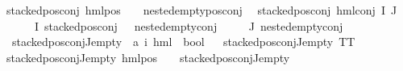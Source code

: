 \begin{isabellebody}
{\isachardoublequoteopen}stacked{\isacharunderscore}{\kern0pt}pos{\isacharunderscore}{\kern0pt}conj\ {\isacharparenleft}{\kern0pt}hml{\isacharunderscore}{\kern0pt}pos\ {\isacharunderscore}{\kern0pt}\ {\isasympsi}{\isacharparenright}{\kern0pt}{\isachardoublequoteclose}\ \ {\isachardoublequoteopen}nested{\isacharunderscore}{\kern0pt}empty{\isacharunderscore}{\kern0pt}pos{\isacharunderscore}{\kern0pt}conj\ {\isasympsi}{\isachardoublequoteclose}\ {\isacharbar}{\kern0pt}\isanewline
{\isachardoublequoteopen}stacked{\isacharunderscore}{\kern0pt}pos{\isacharunderscore}{\kern0pt}conj\ {\isacharparenleft}{\kern0pt}hml{\isacharunderscore}{\kern0pt}conj\ I\ J\ {\isasymPhi}{\isacharparenright}{\kern0pt}{\isachardoublequoteclose}\isanewline
{}\ {\isachardoublequoteopen}{\isasymforall}{\isasymphi}\ {\isasymin}\ {\isacharparenleft}{\kern0pt}{\isasymPhi}\ {\isacharbackquote}{\kern0pt}\ I{\isacharparenright}{\kern0pt}{\isachardot}{\kern0pt}\ {\isacharparenleft}{\kern0pt}{\isacharparenleft}{\kern0pt}stacked{\isacharunderscore}{\kern0pt}pos{\isacharunderscore}{\kern0pt}conj\ {\isasymphi}{\isacharparenright}{\kern0pt}\ {\isasymor}\ nested{\isacharunderscore}{\kern0pt}empty{\isacharunderscore}{\kern0pt}conj\ {\isasymphi}{\isacharparenright}{\kern0pt}{\isachardoublequoteclose}\isanewline
{\isachardoublequoteopen}{\isacharparenleft}{\kern0pt}{\isasymforall}{\isasympsi}\ {\isasymin}\ {\isacharparenleft}{\kern0pt}{\isasymPhi}\ {\isacharbackquote}{\kern0pt}\ J{\isacharparenright}{\kern0pt}{\isachardot}{\kern0pt}\ nested{\isacharunderscore}{\kern0pt}empty{\isacharunderscore}{\kern0pt}conj\ {\isasympsi}{\isacharparenright}{\kern0pt}{\isachardoublequoteclose}\isanewline
\isanewline
{}\isamarkupfalse%
\ stacked{\isacharunderscore}{\kern0pt}pos{\isacharunderscore}{\kern0pt}conj{\isacharunderscore}{\kern0pt}J{\isacharunderscore}{\kern0pt}empty\ {\isacharcolon}{\kern0pt}{\isacharcolon}{\kern0pt}\ {\isachardoublequoteopen}{\isacharparenleft}{\kern0pt}{\isacharprime}{\kern0pt}a{\isacharcomma}{\kern0pt}\ {\isacharprime}{\kern0pt}i{\isacharparenright}{\kern0pt}\ hml\ {\isasymRightarrow}\ bool{\isachardoublequoteclose}\isanewline
\ \ \isanewline
{\isachardoublequoteopen}stacked{\isacharunderscore}{\kern0pt}pos{\isacharunderscore}{\kern0pt}conj{\isacharunderscore}{\kern0pt}J{\isacharunderscore}{\kern0pt}empty\ TT{\isachardoublequoteclose}\ {\isacharbar}{\kern0pt}\isanewline
{\isachardoublequoteopen}stacked{\isacharunderscore}{\kern0pt}pos{\isacharunderscore}{\kern0pt}conj{\isacharunderscore}{\kern0pt}J{\isacharunderscore}{\kern0pt}empty\ {\isacharparenleft}{\kern0pt}hml{\isacharunderscore}{\kern0pt}pos\ {\isacharunderscore}{\kern0pt}\ {\isasympsi}{\isacharparenright}{\kern0pt}{\isachardoublequoteclose}\ \ {\isachardoublequoteopen}stacked{\isacharunderscore}{\kern0pt}pos{\isacharunderscore}{\kern0pt}conj{\isacharunderscore}{\kern0pt}J{\isacharunderscore}{\kern0pt}empty\ {\isasympsi}{\isachardoublequoteclose}\ {\isacharbar}{\kern0pt}\isanewline

\end{isabellebody}
